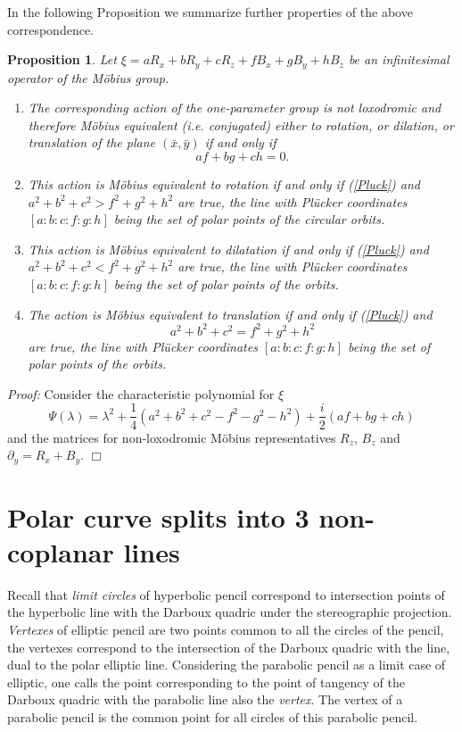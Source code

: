 \documentclass[11pt,a4paper]{article}
\newtheorem{proposition}[theorem]{Proposition}
\begin{document}
In the following Proposition we summarize further properties of the above correspondence. 
\begin{proposition}\label{operline}
Let $\xi =aR_x+bR_y+cR_z+fB_x+gB_y+hB_z$ be an infinitesimal operator of the Möbius group. 
\begin{enumerate}
\item The corresponding action of the one-parameter group is not loxodromic and therefore  Möbius  equivalent (i.e. conjugated) either to rotation, or dilation, or translation of the plane $(\bar{x},\bar{y})$ if and only if \begin{equation}\label{Pluck}
af+bg+ch=0.
\end{equation}
\item This action is Möbius  equivalent  to rotation if and only if (\ref{Pluck}) and
$a^2+b^2+c^2>f^2+g^2+h^2$ are true, the line with Plücker coordinates $[a:b:c:f:g:h]$ being the set of polar points of the circular orbits.   
\item This action is Möbius  equivalent  to dilatation if and only if (\ref{Pluck}) and
$a^2+b^2+c^2<f^2+g^2+h^2$ are true, the line with Plücker coordinates $[a:b:c:f:g:h]$ being the set of polar points of the orbits.   
\item The action is Möbius  equivalent  to translation if and only if (\ref{Pluck}) and
\begin{equation}\label{quadrcomplex}
a^2+b^2+c^2=f^2+g^2+h^2
\end{equation} are true, the line with Plücker coordinates $[a:b:c:f:g:h]$ being the set of polar points of the orbits.   
\end{enumerate}
\end{proposition}
{\it Proof:} Consider the characteristic polynomial for $\xi$ 
$$
\Psi (\lambda)=\lambda^2 +\frac{1}{4}( a^2 + b^2 + c^2 - f^2 - g^2 - h^2)+\frac{i}{2}(af + bg +ch)  
$$ 
and the matrices for non-loxodromic Möbius representatives $R_z$, $B_z$ and $\partial_y=R_x+B_y$. 
\hfill $\Box$\\ 


\section{Polar curve splits into 3 non-coplanar lines}
Recall that {\it limit circles} of hyperbolic pencil correspond to intersection points of the hyperbolic line with the Darboux quadric under the stereographic projection.  {\it Vertexes} of elliptic pencil are two points common to all the circles of the pencil, the vertexes correspond to the intersection of the Darboux quadric with the line, dual to the polar elliptic line. Considering the parabolic pencil as a limit case of elliptic, one calls the point corresponding to the point of tangency of the Darboux quadric with the parabolic line also the {\it vertex}. The vertex of a parabolic pencil is the common point for all circles of this parabolic pencil. 
\end{document}
